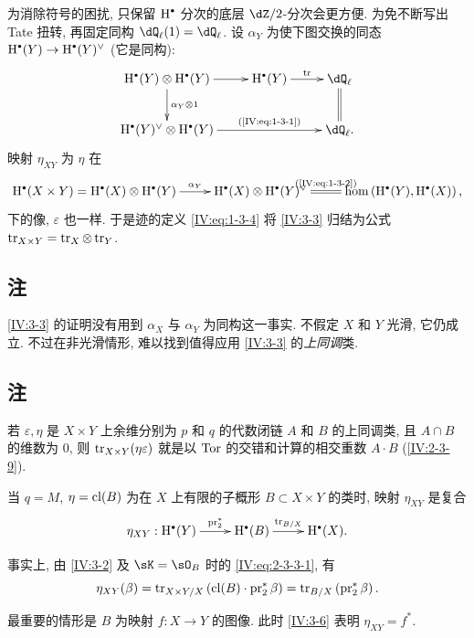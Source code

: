 为消除符号的困扰, 只保留 $\h^\bullet$ 分次的底层 $\dZ/2$-分次会更方便.
为免不断写出 Tate 扭转, 再固定同构 $\dQ_\ell(1)=\dQ_\ell$.
设 $\alpha_Y$ 为使下图交换的同态 $\h^\bullet(Y)\to \h^\bullet(Y)^\vee$ (它是同构):
\[\xymatrix{
  \h^\bullet(Y)\otimes \h^\bullet(Y) \ar[r] \ar[d]^-{\alpha_Y\otimes 1}
    & \h^\bullet(Y) \ar[r]^-{\tr}
    & \dQ_\ell \ar@{=}[d] \\
  \h^\bullet(Y)^\vee \otimes \h^\bullet(Y) \ar[rr]^-{\text{(\ref{IV:eq:1-3-1})}}
    & & \dQ_\ell \text{.}
}\]
映射 $\eta_{X Y}$ 为 $\eta$ 在
\[\xymatrix{
  \h^\bullet(X\times Y) = \h^\bullet(X)\otimes \h^\bullet(Y) \ar[r]^-{\alpha_Y}
    & \h^\bullet(X) \otimes \h^\bullet(Y)^\vee \ar@{=}[r]^-{\text{(\ref{IV:eq:1-3-2})}}
    & \hom\left(\h^\bullet(Y),\h^\bullet(X)\right) \text{,}
}\]
下的像, $\varepsilon$ 也一样.
于是迹的定义 \ref{IV:eq:1-3-4} 将 \ref{IV:3-3} 归结为公式 $\operatorname{tr}_{X\times Y}=\operatorname{tr}_X\otimes \operatorname{tr}_Y$.

\subsection{注}\label{IV:3-4}

\ref{IV:3-3} 的证明没有用到 $\alpha_X$ 与 $\alpha_Y$ 为同构这一事实.
不假定 $X$ 和 $Y$ 光滑, 它仍成立.
不过在非光滑情形, 难以找到值得应用 \ref{IV:3-3} 的\emph{上同调}类.

\subsection{注}\label{IV:3-5}

若 $\varepsilon,\eta$ 是 $X\times Y$ 上余维分别为 $p$ 和 $q$ 的代数闭链 $A$ 和 $B$ 的上同调类,
且 $A\cap B$ 的维数为 $0$, 则 $\operatorname{tr}_{X\times Y}(\eta\varepsilon)$
就是以 $\operatorname{Tor}$ 的交错和计算的相交重数 $A\cdot B$ (\ref{IV:2-3-9}).

\begin{proposition_}\label{IV:3-6}
当 $q=M$, $\eta=\operatorname{cl}(B)$ 为在 $X$ 上有限的子概形 $B\subset X\times Y$ 的类时,
映射 $\eta_{X Y}$ 是复合
\[\xymatrix{
  \eta_{X Y} : \h^\bullet(Y) \ar[r]^-{\operatorname{pr}_2^\ast}
    & \h^\bullet(B) \ar[r]^-{\tr_{B/X}}
    & \h^\bullet(X) \text{.}
}\]
\end{proposition_}

事实上, 由 \ref{IV:3-2} 及 $\sK=\sO_B$ 时的 \eqref{IV:eq:2-3-3-1}, 有
\[
  \eta_{X Y}(\beta) = \operatorname{tr}_{X\times Y/X}\left(\operatorname{cl}(B)\cdot \operatorname{pr}_2^\ast\beta\right) = \operatorname{tr}_{B/X}\left(\operatorname{pr}_2^\ast \beta\right) \text{.}
\]

最重要的情形是 $B$ 为映射 $f:X\to Y$ 的图像.
此时 \ref{IV:3-6} 表明 $\eta_{X Y}=f^\ast$.

